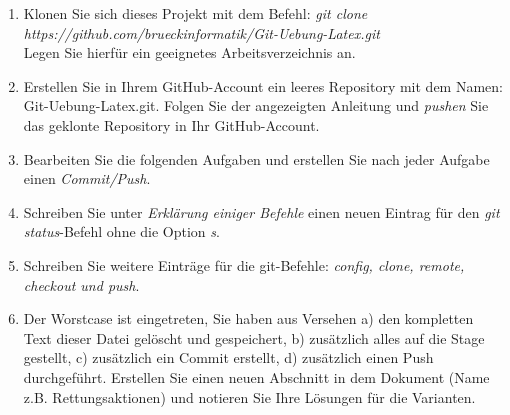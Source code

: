 \documentclass[10pt]{article}
\begin{document}
\begin{enumerate}
  
\item Klonen Sie sich dieses Projekt mit dem Befehl: \linebreak \textsl{git clone https://github.com/brueckinformatik/Git-Uebung-Latex.git}\\
Legen Sie hierfür ein geeignetes Arbeitsverzeichnis an.
\item Erstellen Sie in Ihrem GitHub-Account ein leeres Repository mit dem Namen: Git-Uebung-Latex.git. Folgen Sie der angezeigten Anleitung und \textsl{pushen} Sie das geklonte Repository in Ihr GitHub-Account.
\item Bearbeiten Sie die folgenden Aufgaben und erstellen Sie nach jeder Aufgabe einen \textsl{Commit/Push}.
\item Schreiben Sie unter \textsl{Erklärung einiger Befehle} einen neuen Eintrag für den \textsl{git status}-Befehl ohne die Option \textsl{s}.
\item Schreiben Sie weitere Einträge für die git-Befehle: \textsl{config, clone, remote, checkout und push}.
  
\item Der Worstcase ist eingetreten, Sie haben aus Versehen a) den kompletten Text dieser Datei gelöscht und gespeichert, b) zusätzlich alles auf die Stage gestellt, c) zusätzlich ein Commit erstellt, d) zusätzlich einen Push durchgeführt. Erstellen Sie einen neuen Abschnitt in dem Dokument (Name z.B. Rettungsaktionen) und notieren Sie Ihre Lösungen für die Varianten.
\end{enumerate}
\end{document}
